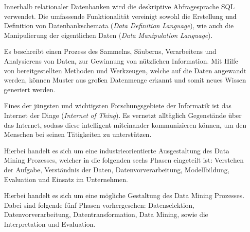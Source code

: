 %
{}%
{Innerhalb relationaler Datenbanken wird die deskriptive Abfragesprache SQL verwendet. Die umfassende Funktionalität vereinigt sowohl die Erstellung und Definition von Datenbankschemata (\textit{Data Definition Language}), wie auch die Manipulierung der eigentlichen Daten (\textit{Data Manipulation Language}).}


%
{}%
{Es beschreibt einen Prozess des \glqq Sammelns, Säuberns, Verarbeitens und Analysierens von Daten, zur Gewinnung von nützlichen Information.\grqq{} Mit Hilfe von bereitgestellten Methoden und Werkzeugen, welche auf die Daten angewandt werden, können Muster aus großen Datenmenge erkannt und somit neues Wissen generiert werden.}

%
{}%
{Eines der jüngsten und wichtigsten Forschungsgebiete der Informatik ist das Internet der Dinge (\textit{Internet of Thing}). Es vernetzt alltäglich Gegenstände über das Internet, sodass diese intelligent miteinander kommunizieren können, um den Menschen bei seinen Tätigkeiten zu unterstützen.}

%
{}%
{Hierbei handelt es sich um eine industrieorientierte Ausgestaltung des Data Mining Prozesses, welcher in die folgenden sechs Phasen eingeteilt ist: Verstehen der Aufgabe, Verständnis der Daten, Datenvorverarbeitung, Modellbildung, Evaluation und Einsatz im Unternehmen.}

%
{}%
{Hierbei handelt es sich um eine mögliche Gestaltung des Data Mining Prozesses. Dabei sind folgende fünf Phasen vorhergesehen: Datenselektion, Datenvorverarbeitung, Datentransformation, Data Mining, sowie die Interpretation und Evaluation.}



